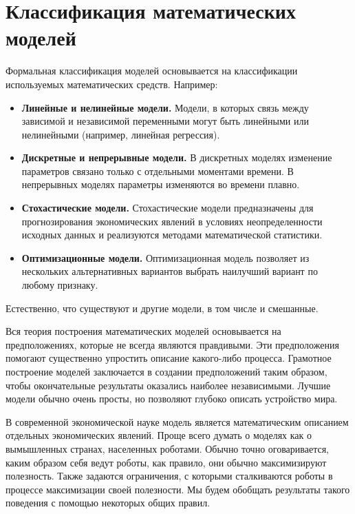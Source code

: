 \section{Классификация математических моделей}

Формальная классификация моделей основывается на классификации используемых математических средств.
Например:
\begin{itemize}
	\item \textbf{Линейные и нелинейные модели.}
	Модели, в которых связь между зависимой и независимой переменными могут быть линейными или нелинейными (например, линейная регрессия).
	\item \textbf{Дискретные и непрерывные модели.}
	В дискретных моделях изменение параметров связано только с отдельными моментами времени.
	В непрерывных моделях параметры изменяются во времени плавно.
	\item \textbf{Стохастические модели.}
	Стохастические модели предназначены для прогнозирования экономических явлений в условиях неопределенности исходных данных и реализуются методами математической статистики.
	\item \textbf{Оптимизационные модели.}
	Оптимизационная модель позволяет из нескольких альтернативных вариантов выбрать наилучший вариант по любому признаку.
\end{itemize}
Естественно, что существуют и другие модели, в том числе и смешанные.

Вся теория построения математических моделей основывается на предположениях, которые не всегда являются правдивыми.
Эти предположения помогают существенно упростить описание какого-либо процесса.
Грамотное построение моделей заключается в создании предположений таким образом, чтобы окончательные результаты оказались наиболее независимыми.
Лучшие модели обычно очень просты, но позволяют глубоко описать устройство мира.

В современной экономической науке модель является математическим описанием отдельных экономических явлений.
Проще всего думать о моделях как о вымышленных странах, населенных роботами.
Обычно точно оговаривается, каким образом себя ведут роботы, как правило, они обычно максимизируют полезность.
Также задаются ограничения, с которыми сталкиваются роботы в процессе максимизации своей полезности.
Мы будем обобщать результаты такого поведения с помощью некоторых общих правил.
